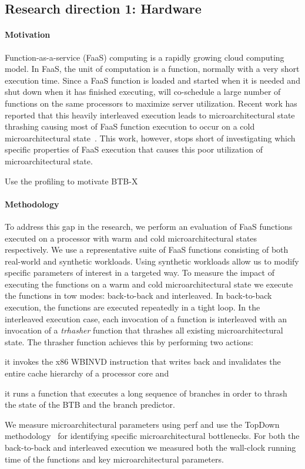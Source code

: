 \documentclass[../main.tex]{subfiles}
\begin{document}
\begin{refsection}
\subsection{Research direction 1: Hardware}


\paragraph{Motivation} Function-as-a-service (FaaS) computing is a rapidly growing cloud computing model. In FaaS, the unit of computation is a function, normally with a very short execution time. Since a FaaS function is loaded and started when it is needed and shut down when it has finished executing, will co-schedule a large number of functions on the same processors to maximize server utilization. Recent work has reported that this heavily interleaved execution leads to microarchitectural state thrashing causing most of FaaS function execution to occur on a cold microarchitectural state~\cite{shahrad19_archit_implic_funct_servic_comput,lukewarm_serverless}. This work, however, stops short of investigating which specific properties of FaaS execution that causes this poor utilization of microarchitectural state.

Use the profiling to motivate BTB-X

\paragraph{Methodology}
To address this gap in the research, we perform an evaluation of FaaS
functions executed on a processor with warm and cold
microarchitectural states respectively. We use a representative suite
of FaaS functions consisting of both real-world and synthetic
workloads. Using synthetic workloads allow us to modify specific
parameters of interest in a targeted way. To measure the impact of
executing the functions on a warm and cold microarchitectural state we
execute the functions in tow modes: back-to-back and interleaved. In
back-to-back execution, the functions are executed repeatedly in a
tight loop. In the interleaved execution case, each invocation of a
function is interleaved with an invocation of a \emph{trhasher}
function that thrashes all existing microarchitectural state. The
thrasher function achieves this by performing two
actions:
\begin{inparaenum}[1)]
\item it invokes the x86 WBINVD
  instruction that writes back and invalidates the entire cache
  hierarchy of a processor core and \item it runs a function that
  executes a long sequence of branches in order to thrash the state of
  the BTB and the branch predictor. \end{inparaenum} We measure
microarchitectural parameters using perf and use the TopDown
methodology~\cite{yasin14_top_down} for identifying specific
microarchitectural bottlenecks. For both the back-to-back and
interleaved execution we measured both the wall-clock running time of
the functions and key microarchitectural parameters.


\end{refsection}
\end{document}
